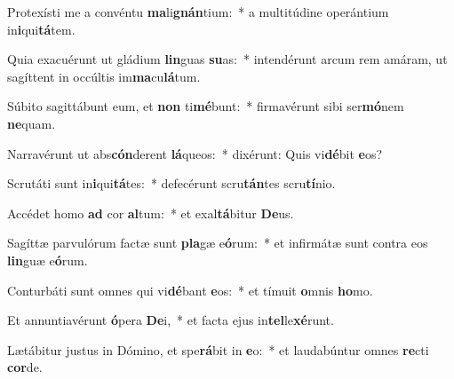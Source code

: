 \item Protexísti me a convéntu \textbf{ma}li\textbf{gnán}tium:~* a multitúdine operántium in\textbf{i}qui\textbf{tá}tem.
\item Quia exacuérunt ut gládium \textbf{lin}guas \textbf{su}as:~* intendérunt arcum rem amáram, ut sagíttent in occúltis im\textbf{ma}cu\textbf{lá}tum.
\item Súbito sagittábunt eum, et \textbf{non} ti\textbf{mé}bunt:~* firmavérunt sibi ser\textbf{mó}nem \textbf{ne}quam.
\item Narravérunt ut abs\textbf{cón}derent \textbf{lá}queos:~* dixérunt: Quis vi\textbf{dé}bit \textbf{e}os?
\item Scrutáti sunt in\textbf{i}qui\textbf{tá}tes:~* defecérunt scru\textbf{tán}tes scru\textbf{tí}nio.
\item Accédet homo \textbf{ad} cor \textbf{al}tum:~* et exal\textbf{tá}bitur \textbf{De}us.
\item Sagíttæ parvulórum factæ sunt \textbf{pla}gæ e\textbf{ó}rum:~* et infirmátæ sunt contra eos \textbf{lin}guæ e\textbf{ó}rum.
\item Conturbáti sunt omnes qui vi\textbf{dé}bant \textbf{e}os:~* et tímuit \textbf{o}mnis \textbf{ho}mo.
\item Et annuntiavérunt \textbf{ó}pera \textbf{De}i,~* et facta ejus in\textbf{tel}le\textbf{xé}runt.
\item Lætábitur justus in Dómino, et spe\textbf{rá}bit in \textbf{e}o:~* et laudabúntur omnes \textbf{re}cti \textbf{cor}de.
